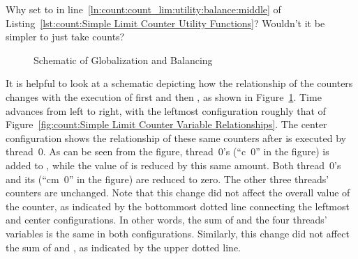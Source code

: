 \QuickQuiz{}
	Why set  to  in
	line~\ref{ln:count:count_lim:utility:balance:middle} of
	Listing~\ref{lst:count:Simple Limit Counter Utility Functions}?
	Wouldn't it be simpler to just take  counts?
 \QuickQuizEnd

\begin{figure}[tb]
\centering
{}
\caption{Schematic of Globalization and Balancing}
\label{fig:count:Schematic of Globalization and Balancing}
\end{figure}

It is helpful to look at a schematic depicting how the relationship
of the counters changes with the execution of first
 and then , as shown in
Figure~\ref{fig:count:Schematic of Globalization and Balancing}.
Time advances from left to right, with the leftmost configuration
roughly that of
Figure~\ref{fig:count:Simple Limit Counter Variable Relationships}.
The center configuration shows the relationship of these same counters
after  is executed by thread~0.
As can be seen from the figure, thread~0's  (``c~0'' in
the figure) is added to , while the value of
 is reduced by this same amount.
Both thread~0's  and its 
(``cm~0'' in the figure) are reduced to zero.
The other three threads' counters are unchanged.
Note that this change did not affect the overall value of the counter,
as indicated by the bottommost dotted line connecting the leftmost
and center configurations.
In other words, the sum of  and the four threads'
 variables is the same in both configurations.
Similarly, this change did not affect the sum of  and
, as indicated by the upper dotted line.

